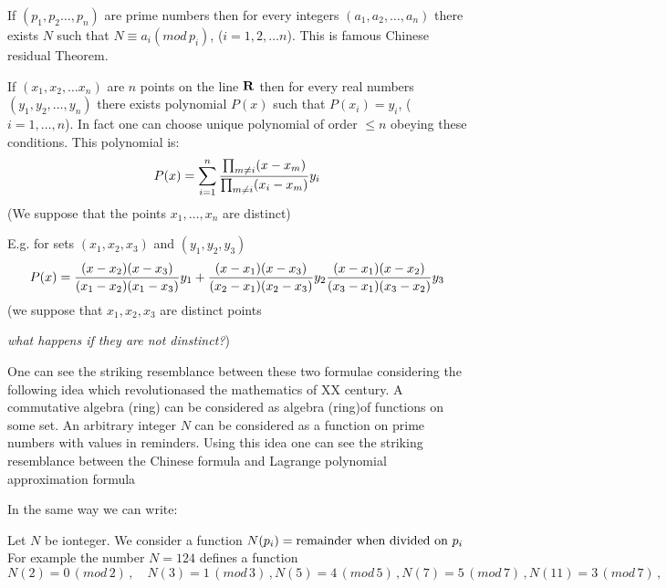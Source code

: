 
 \baselineskip=14pt
\def\vare {\varepsilon}
\def\A {{\bf A}}
\def\t {\tilde}
\def\a {\alpha}
\def\K {{\bf K}}
\def\N {{\bf N}}
\def\V {{\cal V}}
\def\s {{\sigma}}
\def\S {{\Sigma}}
\def\s {{\sigma}}
\def\p{\partial}
\def\vare{{\varepsilon}}
\def\Q {{\bf Q}}
\def\D {{\cal D}}
\def\G {{\Gamma}}
\def\C {{\bf C}}
\def\M {{\cal M}}
\def\Z {{\bf Z}}
\def\U  {{\cal U}}
\def\H {{\cal H}}
\def\R  {{\bf R}}
\def\E  {{\bf E}}
\def\l {\lambda}
\def\degree {{\bf {\rm degree}\,\,}}
\def \finish {${\,\,\vrule height1mm depth2mm width 8pt}$}
\def \m {\medskip}
\def\p {\partial}
\def\r {{\bf r}}
\def\v {{\bf v}}
\def\n {{\bf n}}
\def\t {{\bf t}}
\def\b {{\bf b}}
\def\e{{\bf e}}
\def\ac {{\bf a}}
\def \X   {{\bf X}}
\def \Y   {{\bf Y}}
\def \x   {{\bf x}}
\def \y   {{\bf y}}


   If $(p_1,p_2\dots,p_n)$ are prime numbers then
for every integers $(a_1,a_2,\dots,a_n)$ there exists $N$ such that
   $N\equiv a_i (mod\, p_i)$, ($i=1,2,\dots n$).  
This is famous Chinese residual Theorem.

  If $(x_1,x_2,\dots x_n)$ are $n$ points on the line $\R$ then
for every real numbers $(y_1,y_2,\dots,y_n)$ there exists polynomial
   $P(x)$ such that $P(x_i)=y_i$, ($i=1,\dots,n$).
In fact one can choose unique polynomial of order $\leq n$ obeying these
conditions.  This polynomial is:
                     $$
P(x)=\sum_{i=1}^n 
  {\prod_{m\not=i}(x-x_m)\over\prod_{m\not=i}(x_i-x_m) }y_i
                     $$
(We suppose that the points $x_1,\dots,x_n$ are distinct)

E.g. for sets $(x_1,x_2,x_3)$ and $(y_1,y_2,y_3)$
                     $$
P(x)=
 {(x-x_2)(x-x_3)\over (x_1-x_2)(x_1-x_3)}y_1+
 {(x-x_1)(x-x_3)\over (x_2-x_1)(x_2-x_3)}y_2
 {(x-x_1)(x-x_2)\over (x_3-x_1)(x_3-x_2)}y_3
                     $$
(we suppose that $x_1,x_2,x_3$ are distinct points

{\it what happens if they are not dinstinct?})


  One can see the striking resemblance between these two formulae
  considering the following idea which revolutionased the mathematics
of XX century. 
  A commutative algebra (ring) can be considered as 
algebra (ring)of functions on some set. An arbitrary integer $N$
can be considered as a function on prime numbers with values in reminders.
  Using this idea one can see the striking resemblance
between the Chinese formula and Lagrange polynomial approximation formula

  In the same way we can write:

Let $N$ be ionteger. We consider a function
 $N(p_i)=\hbox{remainder when divided on $p_i$}$
 For example the number $N=124$ defines a function
                     $$
N(2)=0\,(mod\, 2)\,,
\quad N(3)=1\,(mod\, 3)\,,
N(5)=4\,(mod\, 5)\,,
N(7)=5\,(mod\, 7)\,,
N(11)=3\,(mod\, 7)\,,
                     $$             
  \bye
